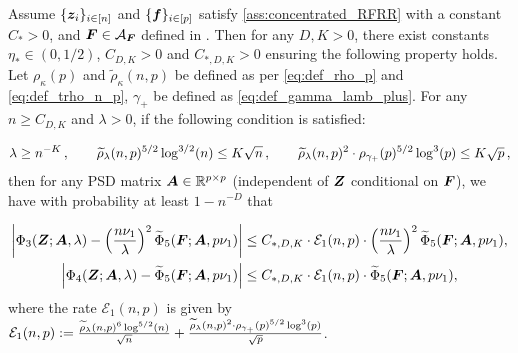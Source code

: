 \begin{proposition}\label{prop:det_Z} Assume \(\{{\boldsymbol z}_i\}_{i \in [n]}\) and \(\{\boldsymbol{f}\}_{i \in [p]}\) satisfy \cref{ass:concentrated_RFRR} with a constant \(C_* > 0\), and ${\boldsymbol F} \in \mathcal{A}_{{\boldsymbol F}}$ defined in \citet[Eq. (79)]{defilippis2024dimension}. Then for any $D, K > 0$, there exist constants $\eta_* \in (0, 1/2)$, $C_{D, K} > 0$ and $C_{*, D, K} > 0$ ensuring the following property holds. Let $\rho_{\kappa}(p)$ and $\tilde{\rho}_{\kappa}(n, p)$ be defined as per \cref{eq:def_rho_p} and \cref{eq:def_trho_n_p}, $\gamma_+$ be defined as \cref{eq:def_gamma_lamb_plus}. For any $n \geq C_{D, K}$ and $\lambda > 0$, if the following
condition is satisfied:

\begin{equation*}
\begin{aligned}
    \lambda  \geq n^{-K}\,, \quad \quad \widetilde{\rho}_{\lambda} (n,p)^{5/2} \log^{3/2} (n) \leq K \sqrt{n}\,, \quad \quad \widetilde{\rho}_\lambda (n,p)^2 \cdot \rho_{\gamma_+} (p)^{5/2} \log^3 (p) \leq K \sqrt{p}\,,
    \end{aligned}
\end{equation*}
then for any PSD matrix ${\boldsymbol A} \in \mathbb{R}^{p \times p}$ (independent of \({\boldsymbol Z}\) conditional on \({\boldsymbol F}\)), we have with probability at least $1 - n^{-D}$ that

\begin{align}
\left| \Phi_3({\boldsymbol Z}; {\boldsymbol A}, \lambda) - \left( \frac{n \nu_1}{\lambda} \right)^2 \widetilde{\Phi}_5({\boldsymbol F}; {\boldsymbol A}, p \nu_1) \right| &\leq C_{*, D, K} \cdot \mathcal{E}_1(n, p) \cdot \left( \frac{n \nu_1}{\lambda} \right)^2 \widetilde{\Phi}_5({\boldsymbol F}; {\boldsymbol A}, p \nu_1), \\
\left| \Phi_4({\boldsymbol Z}; {\boldsymbol A}, \lambda) - \widetilde{\Phi}_5({\boldsymbol F}; {\boldsymbol A}, p \nu_1) \right| &\leq C_{*, D, K} \cdot \mathcal{E}_1(n, p) \cdot \widetilde{\Phi}_5({\boldsymbol F}; {\boldsymbol A}, p \nu_1),
\end{align}
where the rate \( \mathcal{E}_1(n, p)\) is given by \( {\mathcal E}_1 (n,p) := \frac{\widetilde{\rho}_\lambda (n,p)^6 \log^{5/2} (n)}{\sqrt{n}} + \frac{\widetilde{\rho}_\lambda (n,p)^2 \cdot \rho_{\gamma_+} (p)^{5/2}  \log^3 (p)}{\sqrt{p}}\).

\end{proposition}
